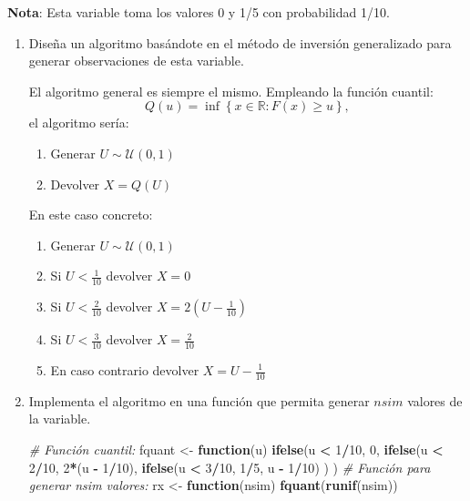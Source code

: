 \documentclass[
]{book}
\newenvironment{Shaded}{\begin{snugshade}}{\end{snugshade}}
\newcommand{\CommentTok}[1]{\textcolor[rgb]{0.56,0.35,0.01}{\textit{#1}}}
\newcommand{\ControlFlowTok}[1]{\textcolor[rgb]{0.13,0.29,0.53}{\textbf{#1}}}
\newcommand{\DecValTok}[1]{\textcolor[rgb]{0.00,0.00,0.81}{#1}}
\newcommand{\KeywordTok}[1]{\textcolor[rgb]{0.13,0.29,0.53}{\textbf{#1}}}
\newcommand{\NormalTok}[1]{#1}
\newcommand{\OperatorTok}[1]{\textcolor[rgb]{0.81,0.36,0.00}{\textbf{#1}}}
\newcommand{\StringTok}[1]{\textcolor[rgb]{0.31,0.60,0.02}{#1}}
\theoremstyle{break}
\theoremstyle{definition}
\theoremstyle{definition}
\theoremstyle{definition}
\theoremstyle{remark}
\begin{document}
\textbf{Nota}: Esta variable toma los valores 0 y 1/5 con probabilidad 1/10.

\begin{enumerate}
\def\labelenumi{\alph{enumi})}
\item
  Diseña un algoritmo basándote en el método de inversión generalizado
  para generar observaciones de esta variable.

  El algoritmo general es siempre el mismo. Empleando la función cuantil:
  \[Q\left( u\right) = \inf \left\{ x\in \mathbb{R}:F\left( x\right) 
  \geq u\right\},\]
  el algoritmo sería:

  \begin{enumerate}
  \def\labelenumii{\arabic{enumii}.}
  \item
    Generar \(U\sim \mathcal{U}\left( 0,1\right)\)
  \item
    Devolver \(X=Q\left( U\right)\)
  \end{enumerate}

  En este caso concreto:

  \begin{enumerate}
  \def\labelenumii{\arabic{enumii}.}
  \item
    Generar \(U\sim \mathcal{U}\left( 0,1\right)\)
  \item
    Si \(U < \frac{1}{10}\) devolver \(X = 0\)
  \item
    Si \(U < \frac{2}{10}\) devolver \(X = 2(U - \frac{1}{10})\)
  \item
    Si \(U < \frac{3}{10}\) devolver \(X = \frac{2}{10}\)
  \item
    En caso contrario devolver \(X = U - \frac{1}{10}\)
  \end{enumerate}
\item
  Implementa el algoritmo en una función que permita generar \(nsim\)
  valores de la variable.

\begin{Shaded}
\begin{Highlighting}[]
\CommentTok{# Función cuantil:}
\NormalTok{fquant <-}\StringTok{ }\ControlFlowTok{function}\NormalTok{(u) }
  \KeywordTok{ifelse}\NormalTok{(u }\OperatorTok{<}\StringTok{ }\DecValTok{1}\OperatorTok{/}\DecValTok{10}\NormalTok{, }\DecValTok{0}\NormalTok{,}
         \KeywordTok{ifelse}\NormalTok{(u }\OperatorTok{<}\StringTok{ }\DecValTok{2}\OperatorTok{/}\DecValTok{10}\NormalTok{, }\DecValTok{2}\OperatorTok{*}\NormalTok{(u }\OperatorTok{-}\StringTok{ }\DecValTok{1}\OperatorTok{/}\DecValTok{10}\NormalTok{),}
                \KeywordTok{ifelse}\NormalTok{(u }\OperatorTok{<}\StringTok{ }\DecValTok{3}\OperatorTok{/}\DecValTok{10}\NormalTok{, }\DecValTok{1}\OperatorTok{/}\DecValTok{5}\NormalTok{, u }\OperatorTok{-}\StringTok{ }\DecValTok{1}\OperatorTok{/}\DecValTok{10}\NormalTok{) ) )}
\CommentTok{# Función para generar nsim valores:}
\NormalTok{rx <-}\StringTok{ }\ControlFlowTok{function}\NormalTok{(nsim) }\KeywordTok{fquant}\NormalTok{(}\KeywordTok{runif}\NormalTok{(nsim))}
\end{Highlighting}
\end{Shaded}


\end{enumerate}
\end{document}
